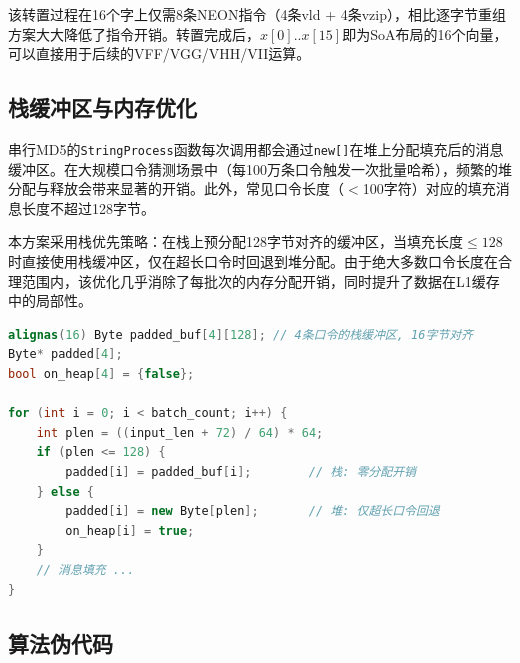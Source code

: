 \documentclass[UTF8,a4paper,10pt]{ctexart}
\begin{document}
该转置过程在16个字上仅需8条NEON指令（4条vld + 4条vzip），相比逐字节重组方案大大降低了指令开销。转置完成后，$x[0]..x[15]$即为SoA布局的16个向量，可以直接用于后续的VFF/VGG/VHH/VII运算。

\subsection{栈缓冲区与内存优化}

串行MD5的\lstinline{StringProcess}函数每次调用都会通过\lstinline{new[]}在堆上分配填充后的消息缓冲区。在大规模口令猜测场景中（每100万条口令触发一次批量哈希），频繁的堆分配与释放会带来显著的开销。此外，常见口令长度（$<$100字符）对应的填充消息长度不超过128字节。

本方案采用栈优先策略：在栈上预分配128字节对齐的缓冲区，当填充长度$\leq 128$时直接使用栈缓冲区，仅在超长口令时回退到堆分配。由于绝大多数口令长度在合理范围内，该优化几乎消除了每批次的内存分配开销，同时提升了数据在L1缓存中的局部性。

\begin{lstlisting}[title=栈优先缓冲区策略,frame=trbl,language={C++}]
alignas(16) Byte padded_buf[4][128]; // 4条口令的栈缓冲区, 16字节对齐
Byte* padded[4];
bool on_heap[4] = {false};

for (int i = 0; i < batch_count; i++) {
    int plen = ((input_len + 72) / 64) * 64;
    if (plen <= 128) {
        padded[i] = padded_buf[i];        // 栈: 零分配开销
    } else {
        padded[i] = new Byte[plen];       // 堆: 仅超长口令回退
        on_heap[i] = true;
    }
    // 消息填充 ...
}
\end{lstlisting}

\subsection{算法伪代码}
\end{document}
